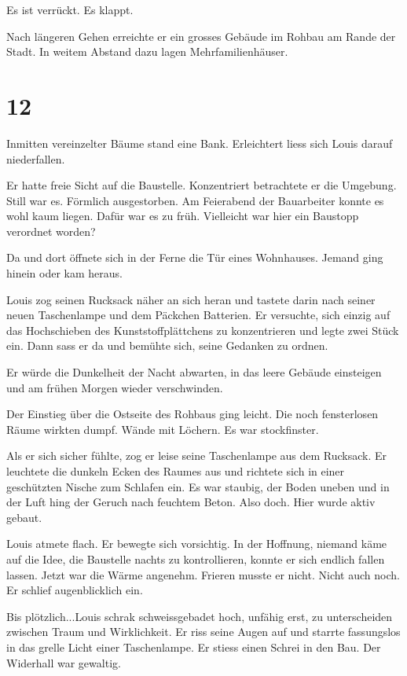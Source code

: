 Es ist verrückt. Es klappt.

Nach längeren Gehen erreichte er ein grosses Gebäude im Rohbau am Rande
der Stadt. In weitem Abstand dazu lagen Mehrfamilienhäuser.

\chapter{12}\label{section-11}

Inmitten vereinzelter Bäume stand eine Bank. Erleichtert liess sich
Louis darauf niederfallen.

Er hatte freie Sicht auf die Baustelle. Konzentriert betrachtete er die
Umgebung. Still war es. Förmlich ausgestorben. Am Feierabend der
Bauarbeiter konnte es wohl kaum liegen. Dafür war es zu früh. Vielleicht
war hier ein Baustopp verordnet worden?

Da und dort öffnete sich in der Ferne die Tür eines Wohnhauses. Jemand
ging hinein oder kam heraus.

Louis zog seinen Rucksack näher an sich heran und tastete darin nach
seiner neuen Taschenlampe und dem Päckchen Batterien. Er versuchte, sich
einzig auf das Hochschieben des Kunststoffplättchens zu konzentrieren
und legte zwei Stück ein. Dann sass er da und bemühte sich, seine
Gedanken zu ordnen.

Er würde die Dunkelheit der Nacht abwarten, in das leere Gebäude
einsteigen und am frühen Morgen wieder verschwinden.

Der Einstieg über die Ostseite des Rohbaus ging leicht. Die noch
fensterlosen Räume wirkten dumpf. Wände mit Löchern. Es war
stockfinster.

Als er sich sicher fühlte, zog er leise seine Taschenlampe aus dem
Rucksack. Er leuchtete die dunkeln Ecken des Raumes aus und richtete
sich in einer geschützten Nische zum Schlafen ein. Es war staubig, der
Boden uneben und in der Luft hing der Geruch nach feuchtem Beton. Also
doch. Hier wurde aktiv gebaut.

Louis atmete flach. Er bewegte sich vorsichtig. In der Hoffnung, niemand
käme auf die Idee, die Baustelle nachts zu kontrollieren, konnte er sich
endlich fallen lassen. Jetzt war die Wärme angenehm. Frieren musste er
nicht. Nicht auch noch. Er schlief augenblicklich ein.

Bis plötzlich...Louis schrak schweissgebadet hoch, unfähig erst, zu
unterscheiden zwischen Traum und Wirklichkeit. Er riss seine Augen auf
und starrte fassungslos in das grelle Licht einer Taschenlampe. Er
stiess einen Schrei in den Bau. Der Widerhall war gewaltig.

